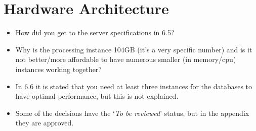 \documentclass[a4paper,10pt]{article}
\begin{document}
\section{Hardware Architecture}
\begin{itemize}
\item How did you get to the server specifications in 6.5?

\item Why is the processing instance 104GB (it's a very specific number) and is it not better/more affordable to have numerous smaller (in memory/cpu) instances working together?

\item In 6.6 it is stated that you need at least three instances for the databases to have optimal performance, but this is not explained.

\item Some of the decisions have the `\textit{To be reviewed}' status, but in the appendix they are approved.

\end{itemize}
\end{document}
